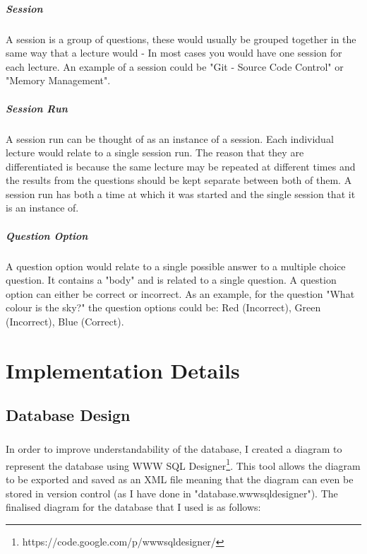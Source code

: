 \documentclass[10pt]{report}
\begin{document}
	\paragraph{Session}
	A session is a group of questions, these would usually be grouped together in the same way that a
	lecture would - In most cases you would have one session for each lecture.  An example of a session
	could be "Git - Source Code Control" or "Memory Management".
	
	\paragraph{Session Run}
	A session run can be thought of as an instance of a session.  Each individual lecture would relate to
	a single session run.  The reason that they are differentiated is because the same lecture may be
	repeated at different times and the results from the questions should be kept separate between both of
	them.  A session run has both a time at which it was started and the single session that it is an
	instance of.
	
	\paragraph{Question Option}
	A question option would relate to a single possible answer to a multiple choice question.  It contains
	a "body" and is related to a single question. A question option can either be correct or incorrect. As
	an example, for the question "What colour is the sky?" the question options could be: Red (Incorrect),
	Green (Incorrect), Blue (Correct).
	
	\chapter*{Implementation Details}
	\section*{Database Design}
	\paragraph{}
	In order to improve understandability of the database, I created a diagram to represent the database
	using WWW SQL Designer\footnote{https://code.google.com/p/wwwsqldesigner/}. This tool allows the
	diagram to be exported and saved as an XML file meaning that the diagram can even be stored in version
	control (as I have done in "database.wwwsqldesigner").  The finalised diagram for the database that
	I used is as follows:
	
\end{document}
